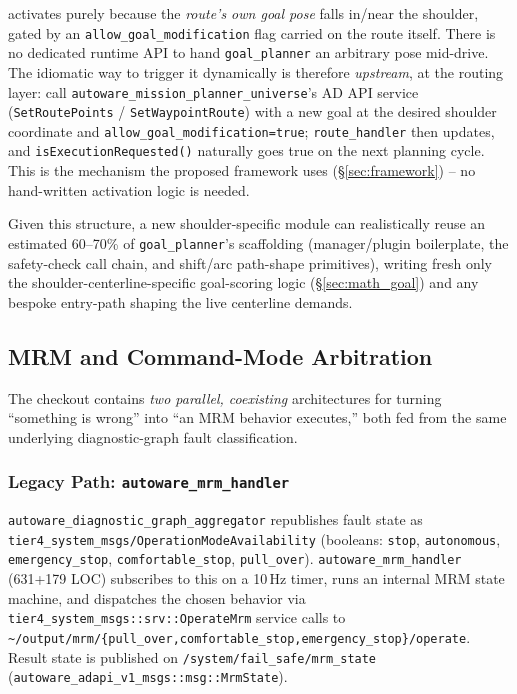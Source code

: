 \documentclass[11pt]{article}
\newcommand{\code}[1]{\texttt{#1}}
\newcommand{\pkg}[1]{\texttt{#1}}
\begin{document}
\begin{itemize}[leftmargin=1.4em]
  activates purely because the \emph{route's own goal pose} falls in/near the shoulder, gated by an
  \code{allow\_goal\_modification} flag carried on the route itself. There is no dedicated runtime
  API to hand \pkg{goal\_planner} an arbitrary pose mid-drive. The idiomatic way to trigger it
  dynamically is therefore \emph{upstream}, at the routing layer: call
  \pkg{autoware\_mission\_planner\_universe}'s AD API service (\code{SetRoutePoints} /
  \code{SetWaypointRoute}) with a new goal at the desired shoulder coordinate and
  \code{allow\_goal\_modification=true}; \code{route\_handler} then updates, and
  \code{isExecutionRequested()} naturally goes true on the next planning cycle. This is the
  mechanism the proposed framework uses (\S\ref{sec:framework}) -- no hand-written activation logic
  is needed.
\end{itemize}

Given this structure, a new shoulder-specific module can realistically reuse an estimated 60--70\%
of \pkg{goal\_planner}'s scaffolding (manager/plugin boilerplate, the safety-check call chain, and
shift/arc path-shape primitives), writing fresh only the shoulder-centerline-specific goal-scoring
logic (\S\ref{sec:math_goal}) and any bespoke entry-path shaping the live centerline demands.

\subsection{MRM and Command-Mode Arbitration}
\label{sec:mrm}

The checkout contains \emph{two parallel, coexisting} architectures for turning ``something is
wrong'' into ``an MRM behavior executes,'' both fed from the same underlying diagnostic-graph fault
classification.

\subsubsection{Legacy Path: \pkg{autoware\_mrm\_handler}}
\pkg{autoware\_diagnostic\_graph\_aggregator} republishes fault state as
\code{tier4\_system\_msgs/OperationModeAvailability} (booleans: \code{stop},
\code{autonomous}, \code{emergency\_stop}, \code{comfortable\_stop}, \code{pull\_over}).
\pkg{autoware\_mrm\_handler} (631+179 LOC) subscribes to this on a 10\,Hz timer, runs an internal
MRM state machine, and dispatches the chosen behavior via
\code{tier4\_system\_msgs::srv::OperateMrm} service calls to
\code{\textasciitilde/output/mrm/\{pull\_over,comfortable\_stop,emergency\_stop\}/operate}. Result
state is published on \code{/system/fail\_safe/mrm\_state}
(\code{autoware\_adapi\_v1\_msgs::msg::MrmState}).
\end{document}
